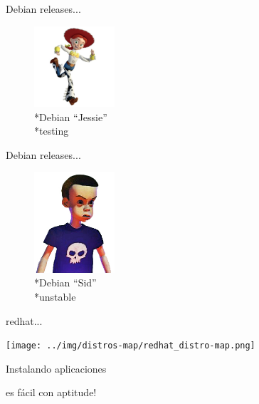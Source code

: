 \documentclass[xcolor=dvipsnames, pdf]{beamer}
\begin{document}
\begin{section}
\begin{subsection}
\begin{frame}
    \end{frame}

    
    \begin{frame}
      {Debian releases...}

      \begin{figure}
        \includegraphics[width=3cm]{../img/debrelease/jessie.jpg}
        \\*Debian ``Jessie'' \\*testing
      \end{figure}

    \end{frame}

    \begin{frame}
      {Debian releases...}

      \begin{figure}
        \includegraphics[width=3cm]{../img/debrelease/sid.jpg}
        \\*Debian ``Sid'' \\*unstable
      \end{figure}

    \end{frame}
    
    \begin{frame}
      {redhat...}
      
      \begin{center} 
        \texttt{[image: ../img/distros-map/redhat\_distro-map.png]} 
      \end{center}
    \end{frame}

    \begin{subsection}
      {Instalando aplicaciones}
      
      \begin{frame}
        {es f\'{a}cil con aptitude!}
        

\end{frame}
\end{subsection}
\end{subsection}
\end{section}
\end{document}
